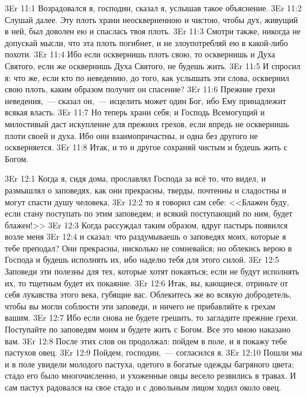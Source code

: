 \vs 3Er 11:1
Возрадовался я, господин,
сказал я, услышав такое объяснение.
\vs 3Er 11:2
Слушай далее. Эту плоть
храни неоскверненною и чистою, чтобы дух, живущий в ней, был доволен ею и
спаслась твоя плоть.
\vs 3Er 11:3
Смотри также, никогда не
допускай мысли, что эта плоть погибнет, и не злоупотребляй ею в какой-либо
похоти.
\vs 3Er 11:4
Ибо если осквернишь плоть
свою, то осквернишь и Духа Святого, если же осквернишь Духа Святого, не будешь
жить.
\vs 3Er 11:5
И спросил я: что же, если
кто по неведению, до того, как услышать эти слова, осквернил свою плоть, каким
образом получит он спасение?
\vs 3Er 11:6
Прежние грехи неведения,~--- сказал он,~--- исцелить может один Бог, ибо Ему принадлежит всякая власть.
\vs 3Er 11:7
Но теперь храни себя; и
Господь Всемогущий и милостивый даст искупление для прежних грехов, если
впредь не осквернишь плоти своей и духа. Ибо они взаимопричастны, и одна без
другого не оскверняется.
\vs 3Er 11:8
Итак, и то и другое
сохраняй чистым и будешь жить с Богом.

\vs 3Er 12:1
Когда я, сидя дома, прославлял Господа за всё то, что видел,
и размышлял о заповедях, как они прекрасны, тверды, почтенны и сладостны и
могут спасти душу человека,
\vs 3Er 12:2
то я говорил сам себе:
<<Блажен буду, если стану поступать по этим заповедям; и всякий поступающий по
ним, будет блажен!>>
\vs 3Er 12:3
Когда рассуждал таким
образом, вдруг пастырь появился возле меня
\vs 3Er 12:4
и сказал: что раздумываешь
о заповедях моих, которые я тебе преподал? Они прекрасны, нисколько не
сомневайся; но облекись верою в Господа и будешь исполнять их, ибо наделю тебя
для этого силой.
\vs 3Er 12:5
Заповеди эти полезны для
тех, которые хотят покаяться; если не будут исполнять их, то тщетным будет их
покаяние.
\vs 3Er 12:6
Итак, вы, кающиеся,
отриньте от себя лукавства этого века, губящие вас. Облекитесь же во всякую
добродетель, чтобы вы могли соблюсти эти заповеди, и ничего не прибавляйте к
грехам вашим.
\vs 3Er 12:7
Ибо если снова не будете
грешить, то загладите прежние грехи. Поступайте по заповедям моим и будете
жить с Богом. Все это мною наказано вам.
\vs 3Er 12:8
После этих слов он
продолжал: пойдем в поле, и я покажу тебе пастухов овец.
\vs 3Er 12:9
Пойдем, господин,~--- согласился я.
\vs 3Er 12:10
Пошли мы и в поле увидели
молодого пастуха, одетого в богатые одежды багряного цвета; стадо его было
многочисленно, и ухоженные овцы весело резвились в травах. И сам пастух
радовался на свое стадо и с довольным лицом ходил около овец.

